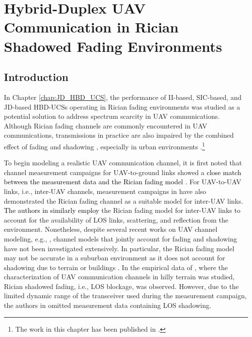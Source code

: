 \chapter{Hybrid-Duplex UAV Communication in Rician Shadowed Fading Environments}
\label{chap:HBD_UCS_Rician_Shadowed}
\section{Introduction}

In Chapter \ref{chap:JD_HBD_UCS}, the performance of II-based, SIC-based, and JD-based HBD-UCSs operating in Rician fading environments was studied as a potential solution to address spectrum scarcity in UAV communications. Although Rician fading channels are commonly encountered in UAV communications, transmissions in practice are also impaired by the combined effect of fading and shadowing \cite{matolak2015unmannedAircraft,matolak2012air}, especially in urban environments \cite{al2014optimal}.\footnote{The work in this chapter has been published in \cite{ernest2019power}.}

To begin modeling a realistic UAV communication channel, it is first noted that channel measurement campaigns for UAV-to-ground links showed a \textcolor{black}{close match between the measurement data and the Rician fading model \cite{sun2017air_hilly}}. For UAV-to-UAV links, i.e., inter-UAV channels, measurement campaigns in \cite{goddemeier2015investigation} have also demonstrated the Rician fading channel as a suitable model for inter-UAV links. \textcolor{black}{The authors in \cite{yuan2018capacity} similarly employ} the Rician fading model for inter-UAV links to account for the availability of LOS links, scattering, and reflection from the environment. Nonetheless, despite several recent works on UAV channel modeling, e.g., \cite{zeng20173d,jin2017three,jiang2019three,jiang2018three}, channel models that jointly account for fading and shadowing have not been investigated extensively. In particular, the Rician fading model may not be accurate in a suburban environment as it does not account for shadowing due to terrain or buildings \cite{matolak2015unmannedAircraft,matolak2012air,al2014optimal}. In the empirical data of \cite{sun2017air_hilly}, where the characterization of UAV communication channels in hilly terrain was studied, Rician shadowed fading, i.e., LOS blockage, was observed. However, due to the limited dynamic range of the transceiver used during the measurement campaign, the authors in \cite{sun2017air_hilly} omitted measurement data containing LOS shadowing.

